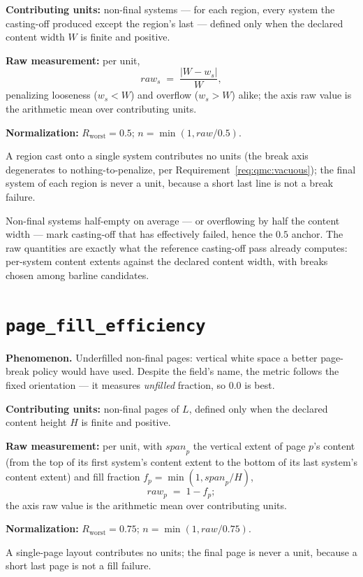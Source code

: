 \documentclass[11pt,letterpaper]{report}
\newcounter{requirement}[chapter]
\begin{document}
\begin{requirement}
\label{req:qmc:system-break}
\textbf{Contributing units:} non-final systems --- for each region, every
system the casting-off produced except the region's last --- defined only
when the declared content width $W$ is finite and positive.

\textbf{Raw measurement:} per unit,
\[
  \mathit{raw}_s \;=\; \frac{|W - w_s|}{W},
\]
penalizing looseness ($w_s < W$) and overflow ($w_s > W$) alike; the axis
raw value is the arithmetic mean over contributing units.

\textbf{Normalization:} $R_{\mathrm{worst}} = 0.5$;
$n = \min(1, \mathit{raw} / 0.5)$.

A region cast onto a single system contributes no units (the break axis
degenerates to nothing-to-penalize, per
Requirement~\ref{req:qmc:vacuous}); the final system of each region is
never a unit, because a short last line is not a break failure.
\end{requirement}

\begin{rationale}
Non-final systems half-empty on average --- or overflowing by half the
content width --- mark casting-off that has effectively failed, hence the
$0.5$ anchor. The raw quantities are exactly what the reference
casting-off pass already computes: per-system content extents against the
declared content width, with breaks chosen among barline candidates.
\end{rationale}

\section{\texttt{page\_fill\_efficiency}}
\label{sec:metrics:page-fill}

\textbf{Phenomenon.} Underfilled non-final pages: vertical white space a
better page-break policy would have used. Despite the field's name, the
metric follows the fixed orientation --- it measures \emph{unfilled}
fraction, so $0.0$ is best.

\begin{requirement}
\label{req:qmc:page-fill}
\textbf{Contributing units:} non-final pages of $L$, defined only when
the declared content height $H$ is finite and positive.

\textbf{Raw measurement:} per unit, with $\mathit{span}_p$ the vertical
extent of page $p$'s content (from the top of its first system's content
extent to the bottom of its last system's content extent) and fill
fraction $f_p = \min(1, \mathit{span}_p / H)$,
\[
  \mathit{raw}_p \;=\; 1 - f_p;
\]
the axis raw value is the arithmetic mean over contributing units.

\textbf{Normalization:} $R_{\mathrm{worst}} = 0.75$;
$n = \min(1, \mathit{raw} / 0.75)$.

A single-page layout contributes no units; the final page is never a
unit, because a short last page is not a fill failure.
\end{requirement}
\end{document}
